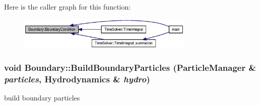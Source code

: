 Here is the caller graph for this function:\nopagebreak
\begin{figure}[H]
\begin{center}
\leavevmode
\includegraphics[width=238pt]{classBoundary_bedd190ee91482e4e59b2a613ab25d57_icgraph}
\end{center}
\end{figure}
\hypertarget{classBoundary_8a40f99b73f3622cd5f1387fcbbdb824}{
\subsubsection[{BuildBoundaryParticles}]{\setlength{\rightskip}{0pt plus 5cm}void Boundary::BuildBoundaryParticles ({\bf ParticleManager} \& {\em particles}, \/  {\bf Hydrodynamics} \& {\em hydro})}}
\label{classBoundary_8a40f99b73f3622cd5f1387fcbbdb824}


build boundary particles 



